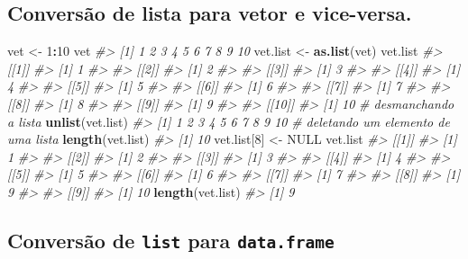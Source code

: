 \documentclass[]{book}
\newenvironment{Shaded}{\begin{snugshade}}{\end{snugshade}}
\newcommand{\KeywordTok}[1]{\textcolor[rgb]{0.13,0.29,0.53}{\textbf{#1}}}
\newcommand{\DecValTok}[1]{\textcolor[rgb]{0.00,0.00,0.81}{#1}}
\newcommand{\StringTok}[1]{\textcolor[rgb]{0.31,0.60,0.02}{#1}}
\newcommand{\CommentTok}[1]{\textcolor[rgb]{0.56,0.35,0.01}{\textit{#1}}}
\newcommand{\OtherTok}[1]{\textcolor[rgb]{0.56,0.35,0.01}{#1}}
\newcommand{\OperatorTok}[1]{\textcolor[rgb]{0.81,0.36,0.00}{\textbf{#1}}}
\newcommand{\NormalTok}[1]{#1}
\begin{document}
\subsection{Conversão de lista para vetor e
vice-versa.}\label{conversao-de-lista-para-vetor-e-vice-versa.}

\begin{Shaded}
\begin{Highlighting}[]
\NormalTok{vet <-}\StringTok{ }\DecValTok{1}\OperatorTok{:}\DecValTok{10}
\NormalTok{vet}
\CommentTok{#>  [1]  1  2  3  4  5  6  7  8  9 10}
\NormalTok{vet.list <-}\StringTok{ }\KeywordTok{as.list}\NormalTok{(vet)}
\NormalTok{vet.list}
\CommentTok{#> [[1]]}
\CommentTok{#> [1] 1}
\CommentTok{#> }
\CommentTok{#> [[2]]}
\CommentTok{#> [1] 2}
\CommentTok{#> }
\CommentTok{#> [[3]]}
\CommentTok{#> [1] 3}
\CommentTok{#> }
\CommentTok{#> [[4]]}
\CommentTok{#> [1] 4}
\CommentTok{#> }
\CommentTok{#> [[5]]}
\CommentTok{#> [1] 5}
\CommentTok{#> }
\CommentTok{#> [[6]]}
\CommentTok{#> [1] 6}
\CommentTok{#> }
\CommentTok{#> [[7]]}
\CommentTok{#> [1] 7}
\CommentTok{#> }
\CommentTok{#> [[8]]}
\CommentTok{#> [1] 8}
\CommentTok{#> }
\CommentTok{#> [[9]]}
\CommentTok{#> [1] 9}
\CommentTok{#> }
\CommentTok{#> [[10]]}
\CommentTok{#> [1] 10}
\CommentTok{# desmanchando a lista}
\KeywordTok{unlist}\NormalTok{(vet.list)}
\CommentTok{#>  [1]  1  2  3  4  5  6  7  8  9 10}
\CommentTok{# deletando um elemento de uma lista}
\KeywordTok{length}\NormalTok{(vet.list)}
\CommentTok{#> [1] 10}
\NormalTok{vet.list[}\DecValTok{8}\NormalTok{] <-}\StringTok{ }\OtherTok{NULL}
\NormalTok{vet.list}
\CommentTok{#> [[1]]}
\CommentTok{#> [1] 1}
\CommentTok{#> }
\CommentTok{#> [[2]]}
\CommentTok{#> [1] 2}
\CommentTok{#> }
\CommentTok{#> [[3]]}
\CommentTok{#> [1] 3}
\CommentTok{#> }
\CommentTok{#> [[4]]}
\CommentTok{#> [1] 4}
\CommentTok{#> }
\CommentTok{#> [[5]]}
\CommentTok{#> [1] 5}
\CommentTok{#> }
\CommentTok{#> [[6]]}
\CommentTok{#> [1] 6}
\CommentTok{#> }
\CommentTok{#> [[7]]}
\CommentTok{#> [1] 7}
\CommentTok{#> }
\CommentTok{#> [[8]]}
\CommentTok{#> [1] 9}
\CommentTok{#> }
\CommentTok{#> [[9]]}
\CommentTok{#> [1] 10}
\KeywordTok{length}\NormalTok{(vet.list)}
\CommentTok{#> [1] 9}
\end{Highlighting}
\end{Shaded}

\subsection{\texorpdfstring{Conversão de \texttt{list} para
\texttt{data.frame}}{Conversão de list para data.frame}}\label{conversao-de-list-para-data.frame}
\end{document}
